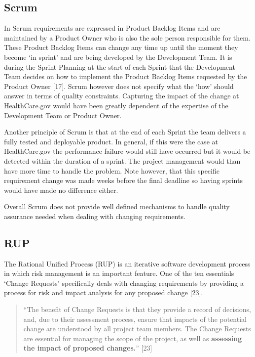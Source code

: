 \documentclass[]{article}
\begin{document}
\subsection{Scrum}\label{scrum-2}

In Scrum requirements are expressed in Product Backlog Items and are
maintained by a Product Owner who is also the sole person responsible
for them. These Product Backlog Items can change any time up until the
moment they become `in sprint' and are being developed by the
Development Team. It is during the Sprint Planning at the start of each
Sprint that the Development Team decides on how to implement the Product
Backlog Items requested by the Product Owner {[}17{]}. Scrum however
does not specify what the `how' should answer in terms of quality
constraints. Capturing the impact of the change at HealthCare.gov would
have been greatly dependent of the expertise of the Development Team or
Product Owner.

Another principle of Scrum is that at the end of each Sprint the team
delivers a fully tested and deployable product. In general, if this were
the case at HealthCare.gov the performance failure would still have
occurred but it would be detected within the duration of a sprint. The
project management would than have more time to handle the problem. Note
however, that this specific requirement change was made weeks before the
final deadline so having sprints would have made no difference either.

Overall Scrum does not provide well defined mechanisms to handle quality
assurance needed when dealing with changing requirements.

\subsection{RUP}\label{rup-1}

The Rational Unified Process (RUP) is an iterative software development
process in which risk management is an important feature. One of the ten
essentials `Change Requests' specifically deals with changing
requirements by providing a process for risk and impact analysis for any
proposed change {[}23{]}.

\begin{quote}
``The benefit of Change Requests is that they provide a record of
decisions, and, due to their assessment process, ensure that impacts of
the potential change are understood by all project team members. The
Change Requests are essential for managing the scope of the project, as
well as \textbf{assessing the impact of proposed changes.}'' {[}23{]}
\end{quote}
\end{document}
